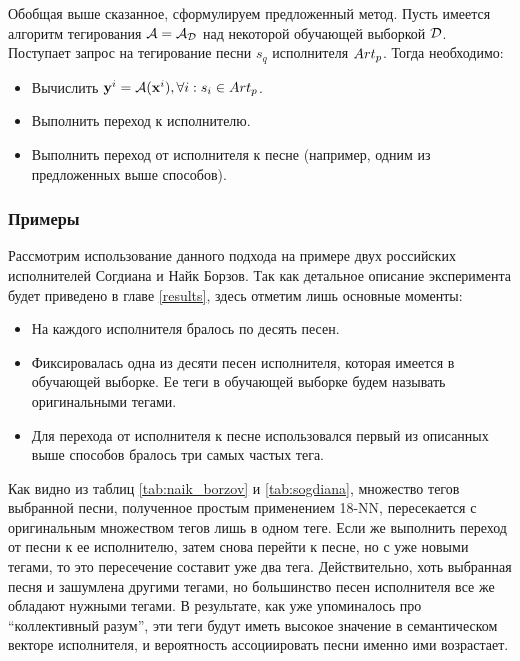 Обобщая выше сказанное, сформулируем предложенный метод. Пусть имеется алгоритм тегирования $\mathcal{A} = \mathcal{A}_{\mathcal{D}}$ над некоторой обучающей выборкой $\mathcal{D}$.
Поступает запрос на тегирование песни $s_q$ исполнителя ${Art}_p$. Тогда необходимо:
\begin{itemize}
 \item Вычислить $\mathbf{y}^i = \mathcal{A}(\mathbf{x}^i), \forall i: s_i \in {Art}_p$.
 \item Выполнить переход к исполнителю.
 \item Выполнить переход от исполнителя к песне (например, одним из предложенных выше способов).
\end{itemize}

\subsubsection{Примеры}

Рассмотрим использование данного подхода на примере двух российских исполнителей \ld Согдиана и Найк Борзов. Так как детальное описание эксперимента будет приведено в главе \ref{results},
здесь отметим лишь основные моменты:
\begin{itemize}
 \item На каждого исполнителя бралось по десять песен.
 \item Фиксировалась одна из десяти песен исполнителя, которая имеется в обучающей выборке. Ее теги в обучающей выборке будем называть оригинальными тегами.
 \item Для перехода от исполнителя к песне использовался первый из описанных выше способов \ld бралось три самых частых тега.
\end{itemize}

Как видно из таблиц \ref{tab:naik_borzov} и \ref{tab:sogdiana}, множество тегов выбранной песни, полученное простым применением 18-NN, 
пересекается с оригинальным множеством тегов лишь в одном теге. Если же выполнить переход от песни к ее исполнителю, затем снова перейти к песне, но с уже новыми тегами,
то это пересечение составит уже два тега. Действительно, хоть выбранная песня и зашумлена другими тегами, но большинство песен исполнителя все же обладают нужными тегами.
В результате, как уже упоминалось про ``коллективный разум'', эти теги будут иметь высокое значение в семантическом векторе исполнителя, 
и вероятность ассоциировать песни именно ими возрастает.

